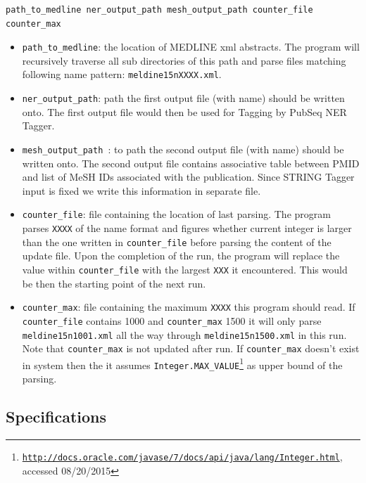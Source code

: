\begin{lstlisting}[breaklines]
path_to_medline ner_output_path mesh_output_path counter_file counter_max
\end{lstlisting}

\begin{itemize}
\item \texttt{path\_to\_medline}: the location of MEDLINE xml abstracts. The program will recursively traverse all sub directories of this path and parse files matching following name pattern: \texttt{meldine15nXXXX.xml}.

\item \texttt{ner\_output\_path}: path the first output file (with name) should be written onto. The first output file would then be used for Tagging by PubSeq NER Tagger.

\item \texttt{mesh\_output\_path }: to path the second output file (with name) should be written onto. The second output file contains associative table between PMID and list of MeSH IDs associated with the publication. Since STRING Tagger input is fixed we write this information in separate file.

\item \texttt{counter\_file}: file containing the location of last parsing. The program parses \texttt{XXXX} of the name format and figures whether current integer is larger than the one written in \texttt{counter\_file} before parsing the content of the update file. Upon the completion of the run, the program will replace the value within \texttt{counter\_file} with the largest \texttt{XXX} it encountered. This would be then the starting point of the next run.

\item \texttt{counter\_max}: file containing the maximum \texttt{XXXX} this program should read. If \texttt{counter\_file} contains 1000 and \texttt{counter\_max} 1500 it will only parse \texttt{meldine15n1001.xml} all the way through \texttt{meldine15n1500.xml} in this run. Note that \texttt{counter\_max} is not updated after run. If \texttt{counter\_max} doesn't exist in system then the it assumes \texttt{Integer.MAX\_VALUE}\footnote{\href{http://docs.oracle.com/javase/7/docs/api/java/lang/Integer.html}{\texttt{http://docs.oracle.com/javase/7/docs/api/java/lang/Integer.html}}, accessed 08/20/2015} as upper bound of the parsing.
\end{itemize}

\subsection{Specifications}

